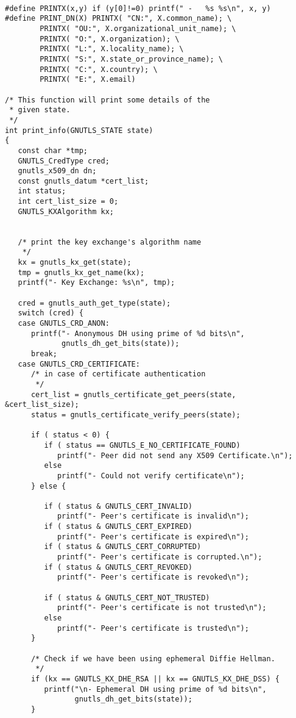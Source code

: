 \begin{verbatim}

#define PRINTX(x,y) if (y[0]!=0) printf(" -   %s %s\n", x, y)
#define PRINT_DN(X) PRINTX( "CN:", X.common_name); \
        PRINTX( "OU:", X.organizational_unit_name); \
        PRINTX( "O:", X.organization); \
        PRINTX( "L:", X.locality_name); \
        PRINTX( "S:", X.state_or_province_name); \
        PRINTX( "C:", X.country); \
        PRINTX( "E:", X.email)

/* This function will print some details of the
 * given state.
 */
int print_info(GNUTLS_STATE state)
{
   const char *tmp;
   GNUTLS_CredType cred;
   gnutls_x509_dn dn;
   const gnutls_datum *cert_list;
   int status;
   int cert_list_size = 0;
   GNUTLS_KXAlgorithm kx;


   /* print the key exchange's algorithm name
    */
   kx = gnutls_kx_get(state);
   tmp = gnutls_kx_get_name(kx);
   printf("- Key Exchange: %s\n", tmp);

   cred = gnutls_auth_get_type(state);
   switch (cred) {
   case GNUTLS_CRD_ANON:
      printf("- Anonymous DH using prime of %d bits\n",
             gnutls_dh_get_bits(state));
      break;
   case GNUTLS_CRD_CERTIFICATE:
      /* in case of certificate authentication
       */
      cert_list = gnutls_certificate_get_peers(state, &cert_list_size);
      status = gnutls_certificate_verify_peers(state);
      
      if ( status < 0) {
         if ( status == GNUTLS_E_NO_CERTIFICATE_FOUND)
            printf("- Peer did not send any X509 Certificate.\n");
         else
            printf("- Could not verify certificate\n");
      } else {

         if ( status & GNUTLS_CERT_INVALID)
            printf("- Peer's certificate is invalid\n");
         if ( status & GNUTLS_CERT_EXPIRED)
            printf("- Peer's certificate is expired\n");
         if ( status & GNUTLS_CERT_CORRUPTED)
            printf("- Peer's certificate is corrupted.\n");
         if ( status & GNUTLS_CERT_REVOKED)
            printf("- Peer's certificate is revoked\n");

         if ( status & GNUTLS_CERT_NOT_TRUSTED)
            printf("- Peer's certificate is not trusted\n");
         else
            printf("- Peer's certificate is trusted\n");
      }

      /* Check if we have been using ephemeral Diffie Hellman.
       */
      if (kx == GNUTLS_KX_DHE_RSA || kx == GNUTLS_KX_DHE_DSS) {
         printf("\n- Ephemeral DH using prime of %d bits\n",
                gnutls_dh_get_bits(state));
      }


\end{verbatim}
